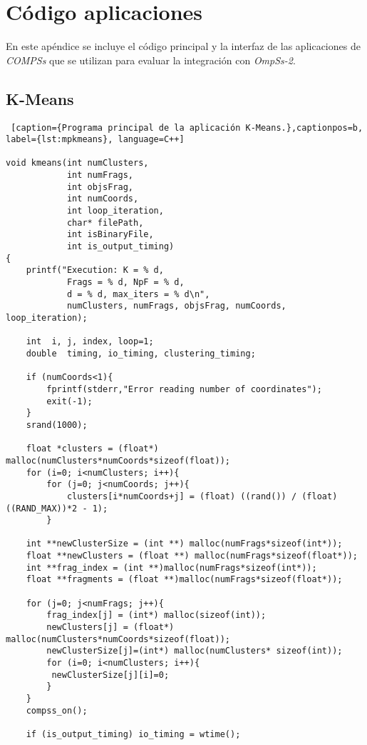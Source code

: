 \chapter{Código aplicaciones}
En este apéndice se incluye el código principal y la interfaz de las aplicaciones de \textit{COMPSs} que se utilizan para evaluar la integración con \textit{OmpSs-2}.

\section{K-Means}
\label{sec:codigokmeans}

\begin{lstlisting} [caption={Programa principal de la aplicación K-Means.},captionpos=b, 
label={lst:mpkmeans}, language=C++]

void kmeans(int numClusters, 
			int numFrags, 
			int objsFrag, 
			int numCoords, 
			int loop_iteration, 
			char* filePath, 
			int isBinaryFile, 
			int is_output_timing)
{
    printf("Execution: K = % d, 
    		Frags = % d, NpF = % d, 
    		d = % d, max_iters = % d\n", 
		    numClusters, numFrags, objsFrag, numCoords, loop_iteration);
 
    int  i, j, index, loop=1;
    double  timing, io_timing, clustering_timing;

    if (numCoords<1){
        fprintf(stderr,"Error reading number of coordinates");
        exit(-1);
    }
    srand(1000);

    float *clusters = (float*) malloc(numClusters*numCoords*sizeof(float));
    for (i=0; i<numClusters; i++){
        for (j=0; j<numCoords; j++){
            clusters[i*numCoords+j] = (float) ((rand()) / (float)((RAND_MAX))*2 - 1);
        }
    
    int **newClusterSize = (int **) malloc(numFrags*sizeof(int*));
    float **newClusters = (float **) malloc(numFrags*sizeof(float*));
    int **frag_index = (int **)malloc(numFrags*sizeof(int*));
    float **fragments = (float **)malloc(numFrags*sizeof(float*));

    for (j=0; j<numFrags; j++){
        frag_index[j] = (int*) malloc(sizeof(int));
        newClusters[j] = (float*) malloc(numClusters*numCoords*sizeof(float));
    	newClusterSize[j]=(int*) malloc(numClusters* sizeof(int));
        for (i=0; i<numClusters; i++){
		 newClusterSize[j][i]=0;
        }
    }
    compss_on();

    if (is_output_timing) io_timing = wtime();


\end{lstlisting}
